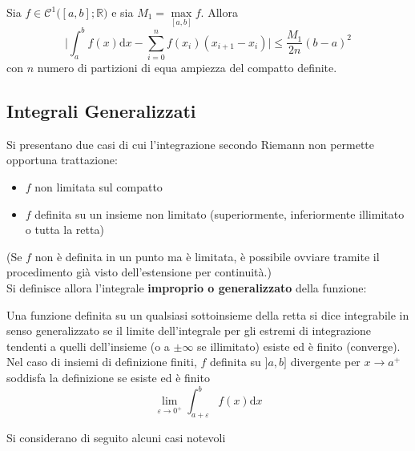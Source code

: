 \documentclass[10pt]{article}
\theoremstyle{plain}
\begin{document}
\begin{ther}
    Sia $f \in \mathcal{C}^1\big([a,b] ; \mathbb{R}\big)$ e sia $M_1 = \max\limits_{[a,b]} f$. Allora
    \[\bigg|\int_{a}^{b} f(x)\textrm{d}x - \sum\limits_{i=0}^n f(x_i) (x_{i+1} - x_i)\bigg| \leq \frac{M_1}{2n}(b-a)^2\]
    con $n$ numero di partizioni di equa ampiezza del compatto definite.
\end{ther}

\subsection{Integrali Generalizzati}
Si presentano due casi di cui l'integrazione secondo Riemann non permette opportuna trattazione:
\begin{itemize}
    \item $f$ non limitata sul compatto
    \item $f$ definita su un insieme non limitato (superiormente, inferiormente illimitato o tutta la retta)
\end{itemize}
(Se $f$ non è definita in un punto ma è limitata, è possibile ovviare tramite il procedimento già visto dell'estensione per continuità.)
\\Si definisce allora l'integrale \textbf{improprio o generalizzato} della funzione:
\begin{defin}
    Una funzione definita su un qualsiasi sottoinsieme della retta si dice integrabile in senso generalizzato se il limite dell'integrale per gli estremi di integrazione tendenti a quelli dell'insieme (o a $\pm \infty$ se illimitato) esiste ed è finito (converge). 
    \\Nel caso di insiemi di definizione finiti, $f$ definita su $]a,b]$ divergente per $x \rightarrow a^+$ soddisfa la definizione se esiste ed è finito
    \[\lim\limits_{\varepsilon \rightarrow 0^+} \int_{a + \varepsilon}^b f(x)\textrm{d}x\]
\end{defin}
Si considerano di seguito alcuni casi notevoli
\end{document}
